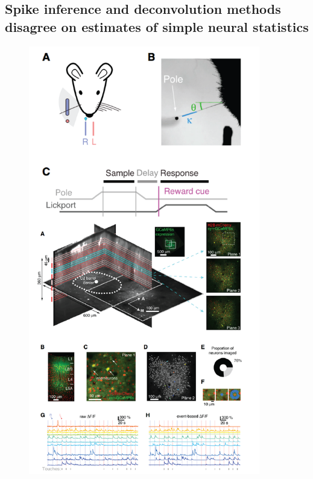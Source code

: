 \documentclass[a4paper,10pt,twocolumn]{article}
\begin{document}
\subsection{Spike inference and deconvolution methods disagree on estimates of simple neural statistics}
\begin{figure}[h!]
\includegraphics[width=0.9\textwidth]{full_figs/why_deconvolve_F2.png}

\end{figure}
\end{document}
